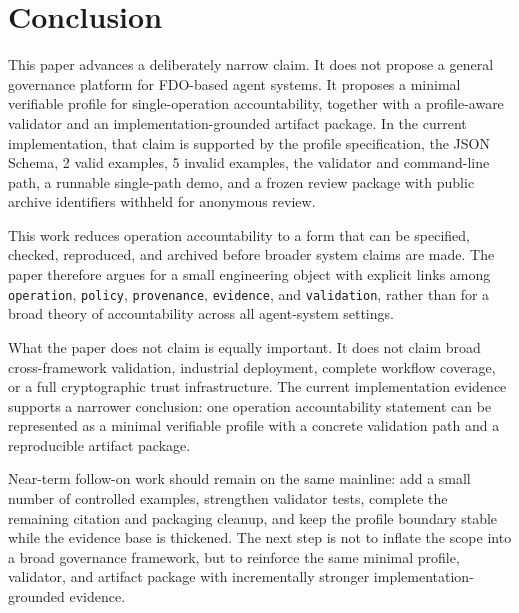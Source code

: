 \section{Conclusion}

This paper advances a deliberately narrow claim. It does not propose a general governance platform for FDO-based agent systems. It proposes a minimal verifiable profile for single-operation accountability, together with a profile-aware validator and an implementation-grounded artifact package. In the current implementation, that claim is supported by the profile specification, the JSON Schema, 2 valid examples, 5 invalid examples, the validator and command-line path, a runnable single-path demo, and a frozen review package with public archive identifiers withheld for anonymous review.

This work reduces operation accountability to a form that can be specified, checked, reproduced, and archived before broader system claims are made. The paper therefore argues for a small engineering object with explicit links among \texttt{operation}, \texttt{policy}, \texttt{provenance}, \texttt{evidence}, and \texttt{validation}, rather than for a broad theory of accountability across all agent-system settings.

What the paper does not claim is equally important. It does not claim broad cross-framework validation, industrial deployment, complete workflow coverage, or a full cryptographic trust infrastructure. The current implementation evidence supports a narrower conclusion: one operation accountability statement can be represented as a minimal verifiable profile with a concrete validation path and a reproducible artifact package.

Near-term follow-on work should remain on the same mainline: add a small number of controlled examples, strengthen validator tests, complete the remaining citation and packaging cleanup, and keep the profile boundary stable while the evidence base is thickened. The next step is not to inflate the scope into a broad governance framework, but to reinforce the same minimal profile, validator, and artifact package with incrementally stronger implementation-grounded evidence.
